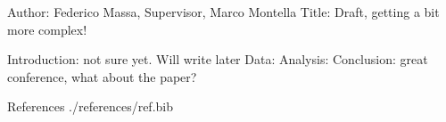 
Author: Federico Massa, Supervisor, Marco Montella
Title: Draft, getting a bit more complex!

Introduction: not sure yet. Will write later
Data:
Analysis:
Conclusion: great conference, what about the paper?

References
./references/ref.bib
